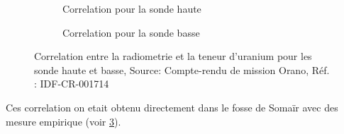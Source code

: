 \begin{figure}
    \centering
    \begin{subfigure}{0.45\textwidth}
        \centering
        \caption{Correlation pour la sonde haute}
        \label{fig:correlation_sonde_haute}
    \end{subfigure}
    \begin{subfigure}{0.45\textwidth}
        \centering
        \caption{Correlation pour la sonde basse}
        \label{fig:correlation_sonde_basse}
    \end{subfigure}
    \caption{Correlation entre la radiometrie et la teneur d'uranium pour les sonde haute et basse, Source: Compte-rendu de mission Orano, Réf. : IDF-CR-001714}
    \label{fig:correlation_sonde}
\end{figure}
Ces correlation on etait obtenu directement dans le fosse de Somaïr avec des mesure empirique (voir \cref{fig:correlation_sonde}).

